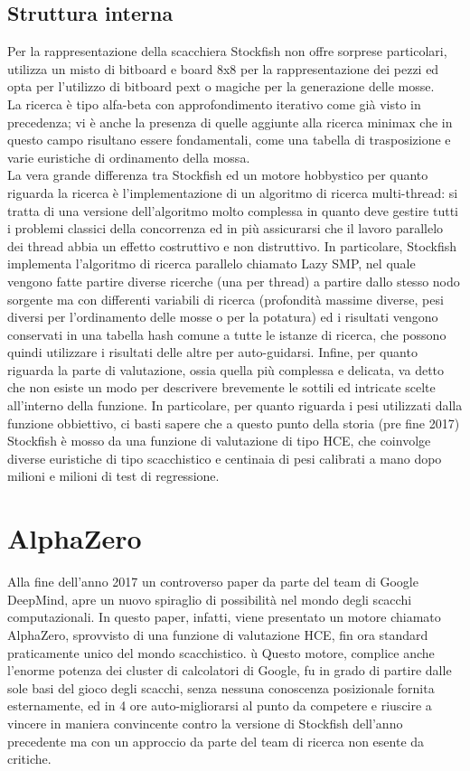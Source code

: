 \subsection{Struttura interna}
Per la rappresentazione della scacchiera Stockfish non offre sorprese particolari, utilizza un misto di bitboard e board 8x8 per la rappresentazione dei pezzi ed opta per l'utilizzo di bitboard pext
o magiche per la generazione delle mosse.\\La ricerca è tipo alfa-beta con approfondimento iterativo come già visto in precedenza; vi è anche la presenza di quelle 
aggiunte alla ricerca minimax che in questo campo risultano essere fondamentali, come una tabella di trasposizione e varie euristiche di ordinamento della mossa.\\La vera grande differenza
tra Stockfish ed un motore hobbystico per quanto riguarda la ricerca è l'implementazione di un algoritmo di ricerca multi-thread: si tratta di una versione dell'algoritmo molto complessa in quanto deve
gestire tutti i problemi classici della concorrenza ed in più assicurarsi che il lavoro parallelo dei thread abbia un effetto costruttivo e non distruttivo. In particolare, Stockfish implementa l'algoritmo di 
ricerca parallelo chiamato Lazy SMP, nel quale vengono fatte partire diverse ricerche (una per thread) a partire dallo stesso nodo sorgente ma con differenti variabili di ricerca (profondità massime diverse, pesi 
diversi per l'ordinamento delle mosse o per la potatura) ed i risultati vengono conservati in una tabella hash comune a tutte le istanze di ricerca, che possono quindi utilizzare i risultati delle altre per 
auto-guidarsi. Infine, per quanto riguarda la parte di valutazione, ossia quella più complessa e delicata, va detto che non esiste un modo per descrivere brevemente le sottili ed intricate scelte all'interno 
della funzione. In particolare, per quanto riguarda i pesi utilizzati dalla funzione obbiettivo, ci basti sapere che a questo punto della storia (pre fine 2017) Stockfish è mosso da una funzione di valutazione 
di tipo HCE, che coinvolge diverse euristiche di tipo scacchistico e centinaia di pesi calibrati a mano dopo milioni e milioni di test di regressione.


\section{AlphaZero}
Alla fine dell'anno 2017 un controverso paper\cite{DBLP:journals/corr/abs-1712-01815} da parte del team di Google DeepMind, apre un nuovo spiraglio di possibilità nel mondo degli scacchi computazionali. In questo paper, infatti, viene presentato un motore chiamato AlphaZero, sprovvisto di una funzione di valutazione HCE, fin ora standard praticamente unico del mondo scacchistico. ù
Questo motore, complice anche l'enorme 
potenza dei cluster di calcolatori di Google, fu in grado di partire dalle sole basi del gioco degli scacchi, senza nessuna conoscenza posizionale fornita esternamente, ed in 4 ore auto-migliorarsi al punto 
da competere e riuscire a vincere in maniera convincente contro la versione di Stockfish dell'anno precedente ma con un approccio da parte del team di ricerca non esente da critiche\cite{chess.com}.




